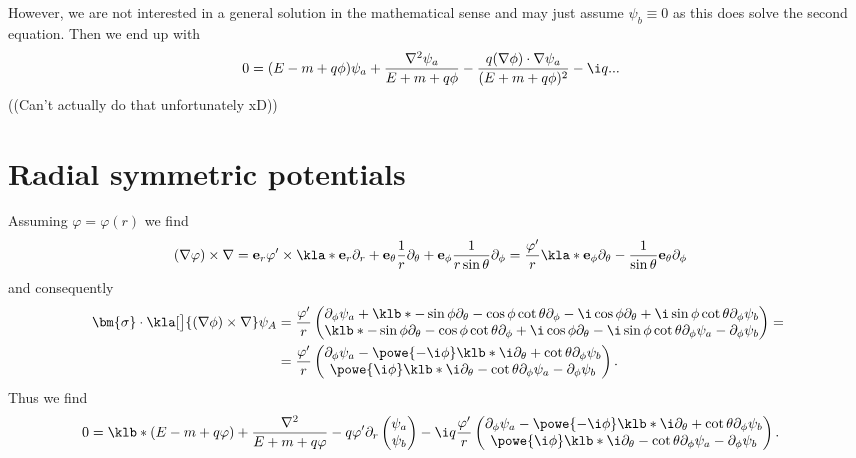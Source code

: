 \documentclass[english, parskip=full]{scrartcl}
\begin{document}
However, we are not interested in a general solution in the mathematical sense and may just assume $\psi_b \equiv 0$ as this does solve the second equation.
Then we end up with 
\begin{align}
0 &= (E-m+q\phi) \psi_a + \frac{\nabla^2\psi_a}{E+m+q\phi} - \frac{q (\nabla\phi) \cdot \nabla \psi_a}{(E+m+q\phi)^2} - \i q ...
\end{align}
((Can't actually do that unfortunately xD))
\section{Radial symmetric potentials}
Assuming $\varphi=\varphi(r)$ we find
\begin{align}
(\nabla\varphi) \times \nabla &= \textbf{e}_r \varphi' \times \kla*{\textbf{e}_r \partial_r + \textbf{e}_\theta \frac{1}{r} \partial_\theta + \textbf{e}_\phi \frac{1}{r\sin\theta} \partial_\phi } = \frac{\varphi'}{r} \kla*{\textbf{e}_\phi \partial_\theta - \frac{1}{\sin\theta} \textbf{e}_\theta \partial_\phi}
\end{align}
and consequently
\begin{align}
\bm{\sigma} \cdot \kla[\big]{(\nabla\phi) \times \nabla}\psi_A &= \frac{\varphi'}{r} \begin{pmatrix}
\partial_\phi \psi_a + \klb*{-\sin\phi\partial_\theta - \cos\phi \cot\theta \partial_\phi - \i\cos\phi \partial_\theta + \i\sin\phi \cot\theta\partial_\phi}\psi_b \\ \klb*{-\sin\phi\partial_\theta - \cos\phi \cot\theta \partial_\phi + \i\cos\phi \partial_\theta - \i\sin\phi \cot\theta\partial_\phi}\psi_a -\partial_\phi\psi_b
\end{pmatrix} = \\
&= \frac{\varphi'}{r} \begin{pmatrix}
\partial_\phi \psi_a - \powe{-\i\phi} \klb*{\i \partial_\theta + \cot\theta\partial_\phi}\psi_b \\ \powe{\i\phi} \klb*{\i\partial_\theta - \cot\theta\partial_\phi}\psi_a - \partial_\phi\psi_b
\end{pmatrix}.
\end{align}
Thus we find
\begin{align}
0 &= \klb*{(E-m+q\varphi) + \frac{\nabla^2}{E+m+q\varphi} -q \varphi' \partial_r } \begin{pmatrix}
\psi_a \\ \psi_b
\end{pmatrix} - \i q\frac{\varphi'}{r} \begin{pmatrix}
\partial_\phi \psi_a - \powe{-\i\phi} \klb*{\i \partial_\theta + \cot\theta\partial_\phi}\psi_b \\ \powe{\i\phi} \klb*{\i\partial_\theta - \cot\theta\partial_\phi}\psi_a - \partial_\phi\psi_b
\end{pmatrix}.
\end{align}
\end{document}
